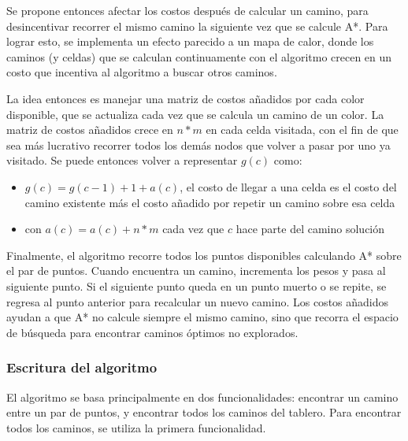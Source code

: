 \documentclass[letter,12pt]{article}
\begin{document}
Se propone entonces afectar los costos después de calcular un camino, para desincentivar recorrer el mismo camino la siguiente vez que se calcule A*. Para lograr esto, se implementa un efecto parecido a un mapa de calor, donde los caminos (y celdas) que se calculan continuamente con el algoritmo crecen en un costo que incentiva al algoritmo a buscar otros caminos. \par

La idea entonces es manejar una matriz de costos añadidos por cada color disponible, que se actualiza cada vez que se calcula un camino de un color. La matriz de costos añadidos crece en $n * m$ en cada celda visitada, con el fin de que sea más lucrativo recorrer todos los demás nodos que volver a pasar por uno ya visitado. Se puede entonces volver a representar $g(c)$ como: \par

\begin{itemize}
    \item $g(c) = g(c - 1) + 1 + a(c)$, el costo de llegar a una celda es el costo del camino existente más el costo añadido por repetir un camino sobre esa celda
    \item con $a(c) = a(c) + n * m$ cada vez que $c$ hace parte del camino solución
\end{itemize}

Finalmente, el algoritmo recorre todos los puntos disponibles calculando A* sobre el par de puntos. Cuando encuentra un camino, incrementa los pesos y pasa al siguiente punto. Si el siguiente punto queda en un punto muerto o se repite, se regresa al punto anterior para recalcular un nuevo camino. Los costos añadidos ayudan a que A* no calcule siempre el mismo camino, sino que recorra el espacio de búsqueda para encontrar caminos óptimos no explorados. \par

\subsubsection{Escritura del algoritmo} \label{analisis:algoritmo:escritura}

El algoritmo se basa principalmente en dos funcionalidades: encontrar un camino entre un par de puntos, y encontrar todos los caminos del tablero. Para encontrar todos los caminos, se utiliza la primera funcionalidad. \par

\newpage
\end{document}

